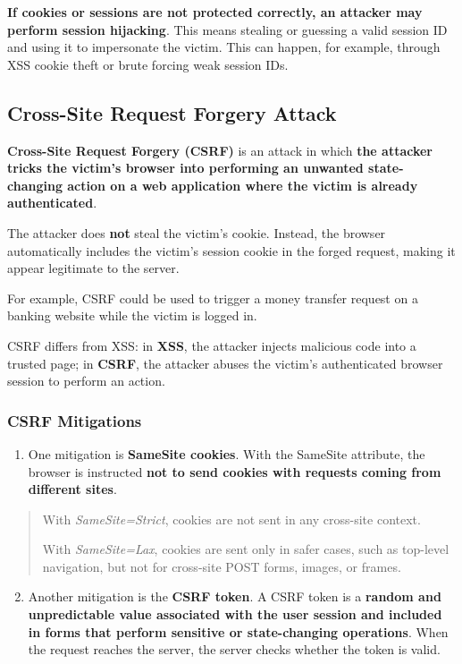 \documentclass{article}
\begin{document}
\textbf{If cookies or sessions are not protected correctly, an attacker may perform session hijacking}. This means stealing or guessing a valid session ID and using it to impersonate the victim. This can happen, for example, through XSS cookie theft or brute forcing weak session IDs.

\subsection{Cross-Site Request Forgery Attack}

\textbf{Cross-Site Request Forgery (CSRF)} is an attack in which \textbf{the attacker tricks the victim's browser into performing an unwanted state-changing action on a web application where the victim is already authenticated}.

The attacker does \textbf{not} steal the victim's cookie. Instead, the browser automatically includes the victim's session cookie in the forged request, making it appear legitimate to the server.

For example, CSRF could be used to trigger a money transfer request on a banking website while the victim is logged in.

CSRF differs from XSS: in \textbf{XSS}, the attacker injects malicious code into a trusted page; in \textbf{CSRF}, the attacker abuses the victim's authenticated browser session to perform an action.

\subsubsection{CSRF Mitigations}

\begin{enumerate}
    \item One mitigation is \textbf{SameSite cookies}. With the SameSite attribute, the browser is instructed \textbf{not to send cookies with requests coming from different sites}.
\end{enumerate}

\begin{quote}
With \textit{SameSite=Strict}, cookies are not sent in any cross-site context.

With \textit{SameSite=Lax}, cookies are sent only in safer cases, such as top-level navigation, but not for cross-site POST forms, images, or frames.
\end{quote}

\begin{enumerate}
    \setcounter{enumi}{1}
    \item Another mitigation is the \textbf{CSRF token}. A CSRF token is a \textbf{random and unpredictable value associated with the user session and included in forms that perform sensitive or state-changing operations}. When the request reaches the server, the server checks whether the token is valid.
\end{enumerate}
\end{document}
